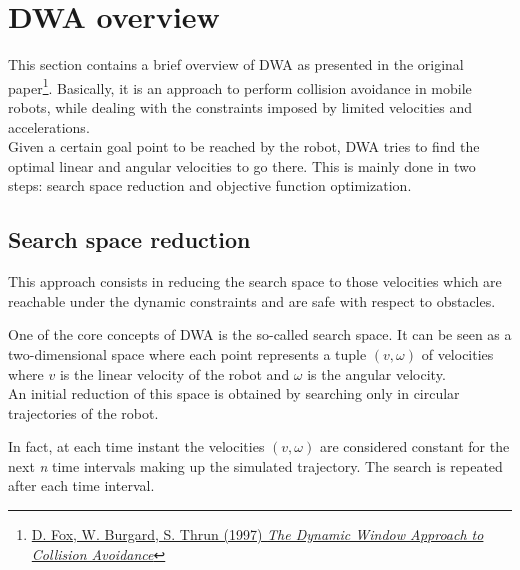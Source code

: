 \documentclass[11pt,a4paper]{article}
\begin{document}

\section{DWA overview}

This section contains a brief overview of DWA as presented in the original paper\footnote{\href{https://www.ri.cmu.edu/pub_files/pub1/fox_dieter_1997_1/fox_dieter_1997_1.pdf}{D. Fox, W. Burgard, S. Thrun (1997) \textit{The Dynamic Window Approach to Collision Avoidance}}}.
Basically, it is an approach to perform collision avoidance in mobile robots, while dealing with the constraints
imposed by limited velocities and accelerations.\\

Given a certain goal point to be reached by the robot, DWA tries to find the optimal linear and angular velocities
to go there. This is mainly done in two steps: search space reduction and objective function optimization.



\subsection{Search space reduction}

This approach consists in reducing the search space to those velocities which are reachable under the dynamic constraints and are safe with respect to obstacles.

One of the core concepts of DWA is the so-called search space. It can be seen as a two-dimensional space where
each point represents a tuple $(v, \omega)$ of velocities where $v$ is the linear velocity of the robot and
$\omega$ is the angular velocity.\\

An initial reduction of this space is obtained by searching only in circular trajectories of the robot.

In fact, at each time instant the velocities $(v, \omega)$ are considered constant for the next \textit{n}
time intervals making up the simulated trajectory. The search is repeated after each time interval.\\
\end{document}
